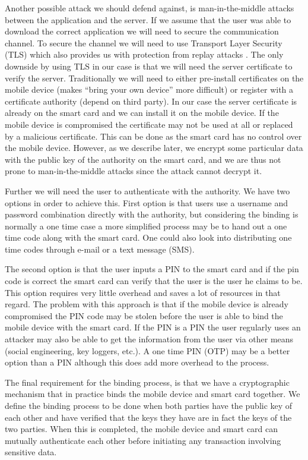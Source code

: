 Another possible attack we should defend against, is man-in-the-middle attacks between the application and the server. If we assume that the user was able to download the correct application we will need to secure the communication channel. To secure the channel we will need to use Transport Layer Security (TLS) \cite{rfc793} which also provides us with protection from replay attacks \cite[~Ch. 9.2.2]{TLS101}. The only downside by using TLS in our case is that we will need the server certificate to verify the server. Traditionally we will need to either pre-install certificates on the mobile device (makes ``bring your own device'' more difficult) or register with a certificate authority (depend on third party). In our case the server certificate is already on the smart card and we can install it on the mobile device. If the mobile device is compromised the certificate may not be used at all or replaced by a malicious certificate. This can be done as the smart card has no control over the mobile device. However, as we describe later, we encrypt some particular data with the public key of the authority on the smart card, and we are thus not prone to man-in-the-middle attacks since the attack cannot decrypt it.

Further we will need the user to authenticate with the authority. We have two options in order to achieve this. First option is that users use a username and password combination directly with the authority, but considering the binding is normally a one time case a more simplified process may be to hand out a one time code along with the smart card. One could also look into distributing one time codes through e-mail or a text message (SMS).

The second option is that the user inputs a PIN to the smart card and if the pin code is correct the smart card can verify that the user is the user he claims to be. This option requires very little overhead and saves a lot of resources in that regard. The problem with this approach is that if the mobile device is already compromised the PIN code may be stolen before the user is able to bind the mobile device with the smart card. If the PIN is a PIN the user regularly uses an attacker may also be able to get the information from the user via other means (social engineering, key loggers, etc.). A one time PIN (OTP) may be a better option than a PIN although this does add more overhead to the process.

The final requirement for the binding process, is that we have a cryptographic mechanism that in practice binds the mobile device and smart card together. We define the binding process to be done when both parties have the public key of each other and have verified that the keys they have are in fact the keys of the two parties. When this is completed, the mobile device and smart card can mutually authenticate each other before initiating any transaction involving sensitive data.

